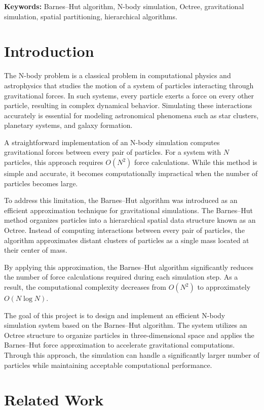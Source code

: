 
\noindent\textbf{Keywords:} Barnes--Hut algorithm, N-body simulation, Octree, gravitational simulation, spatial partitioning, hierarchical algorithms.
\section{Introduction}

The N-body problem is a classical problem in computational physics and astrophysics that studies the motion of a system of particles interacting through gravitational forces. In such systems, every particle exerts a force on every other particle, resulting in complex dynamical behavior. Simulating these interactions accurately is essential for modeling astronomical phenomena such as star clusters, planetary systems, and galaxy formation.

A straightforward implementation of an N-body simulation computes gravitational forces between every pair of particles. For a system with $N$ particles, this approach requires $O(N^2)$ force calculations. While this method is simple and accurate, it becomes computationally impractical when the number of particles becomes large.

To address this limitation, the Barnes--Hut algorithm was introduced as an efficient approximation technique for gravitational simulations. The Barnes--Hut method organizes particles into a hierarchical spatial data structure known as an Octree. Instead of computing interactions between every pair of particles, the algorithm approximates distant clusters of particles as a single mass located at their center of mass.

By applying this approximation, the Barnes--Hut algorithm significantly reduces the number of force calculations required during each simulation step. As a result, the computational complexity decreases from $O(N^2)$ to approximately $O(N\log N)$.

The goal of this project is to design and implement an efficient N-body simulation system based on the Barnes--Hut algorithm. The system utilizes an Octree structure to organize particles in three-dimensional space and applies the Barnes--Hut force approximation to accelerate gravitational computations. Through this approach, the simulation can handle a significantly larger number of particles while maintaining acceptable computational performance.

\section{Related Work}

